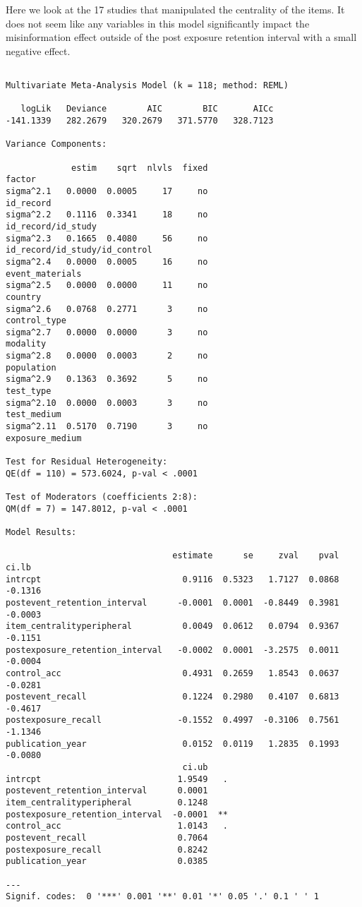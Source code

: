 \documentclass[
  letterpaper,
  DIV=11,
  numbers=noendperiod]{scrartcl}
\begin{document}
Here we look at the 17 studies that manipulated the centrality of the
items. It does not seem like any variables in this model significantly
impact the misinformation effect outside of the post exposure retention
interval with a small negative effect.

\begin{verbatim}

Multivariate Meta-Analysis Model (k = 118; method: REML)

   logLik   Deviance        AIC        BIC       AICc   
-141.1339   282.2679   320.2679   371.5770   328.7123   

Variance Components:

             estim    sqrt  nlvls  fixed                         factor 
sigma^2.1   0.0000  0.0005     17     no                      id_record 
sigma^2.2   0.1116  0.3341     18     no             id_record/id_study 
sigma^2.3   0.1665  0.4080     56     no  id_record/id_study/id_control 
sigma^2.4   0.0000  0.0005     16     no                event_materials 
sigma^2.5   0.0000  0.0000     11     no                        country 
sigma^2.6   0.0768  0.2771      3     no                   control_type 
sigma^2.7   0.0000  0.0000      3     no                       modality 
sigma^2.8   0.0000  0.0003      2     no                     population 
sigma^2.9   0.1363  0.3692      5     no                      test_type 
sigma^2.10  0.0000  0.0003      3     no                    test_medium 
sigma^2.11  0.5170  0.7190      3     no                exposure_medium 

Test for Residual Heterogeneity:
QE(df = 110) = 573.6024, p-val < .0001

Test of Moderators (coefficients 2:8):
QM(df = 7) = 147.8012, p-val < .0001

Model Results:

                                 estimate      se     zval    pval    ci.lb 
intrcpt                            0.9116  0.5323   1.7127  0.0868  -0.1316 
postevent_retention_interval      -0.0001  0.0001  -0.8449  0.3981  -0.0003 
item_centralityperipheral          0.0049  0.0612   0.0794  0.9367  -0.1151 
postexposure_retention_interval   -0.0002  0.0001  -3.2575  0.0011  -0.0004 
control_acc                        0.4931  0.2659   1.8543  0.0637  -0.0281 
postevent_recall                   0.1224  0.2980   0.4107  0.6813  -0.4617 
postexposure_recall               -0.1552  0.4997  -0.3106  0.7561  -1.1346 
publication_year                   0.0152  0.0119   1.2835  0.1993  -0.0080 
                                   ci.ub     
intrcpt                           1.9549   . 
postevent_retention_interval      0.0001     
item_centralityperipheral         0.1248     
postexposure_retention_interval  -0.0001  ** 
control_acc                       1.0143   . 
postevent_recall                  0.7064     
postexposure_recall               0.8242     
publication_year                  0.0385     

---
Signif. codes:  0 '***' 0.001 '**' 0.01 '*' 0.05 '.' 0.1 ' ' 1
\end{verbatim}
\end{document}
